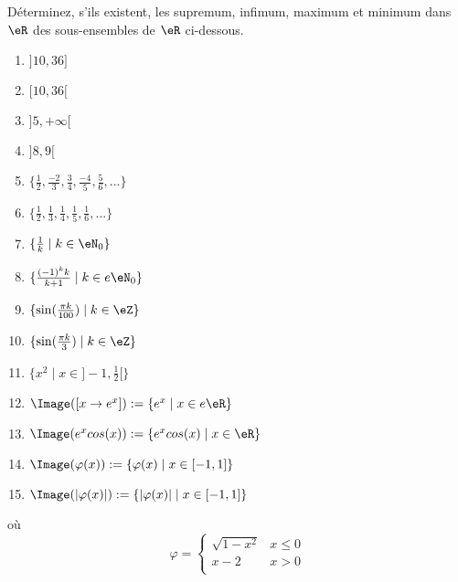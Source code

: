 
\begin{exercice}\label{exo0001}

Déterminez, s'ils existent, les supremum, infimum, maximum et minimum dans $\eR$ des sous-ensembles de $\eR$ ci-dessous.
\begin{multicols}{2}
\begin{enumerate}
\item $]10,36] $
\item $[10,36[ $
\item $]5,+\infty[ $
\item $]8,9[ $
\item $\{ \frac{1}{2}, \frac{-2}{3}, \frac{3}{4}, \frac{-4}{5},  \frac{5}{6}, ... \} $
\item $\{ \frac{1}{2}, \frac{1}{3}, \frac{1}{4}, \frac{1}{5},  \frac{1}{6}, ... \} $
\item\label{itemexo1g} $\{ \frac{1}{k} \mid k \in \eN_0 \} $
\item\label{itemexo1h} $\{ \frac{(-1)^k k}{k+1} \mid k \in e\eN_0 \} $
\item $\{ \sin(\frac{\pi k}{100}) \mid k \in \eZ \} $
\item $\{ \sin(\frac{\pi k}{3}) \mid k \in \eZ \} $
\item\label{itemexo1k}  $\{ x^2 \mid x\in ]-1,\frac{1}{2} [ \} $
\item $\Image([x \rightarrow e^x]) := \{ e^x \mid x\in e\eR \}$
\item $\Image(e^x cos(x)) := \{ e^x cos(x) \mid x\in \eR \} $
\item $\Image(\varphi(x)) := \{ \varphi(x) \mid x \in [-1,1] \} $
\item $\Image( |\varphi(x)| ) := \{  |\varphi(x)| \mid x \in [-1,1] \} $
\end{enumerate}
\end{multicols}
où
\[
\varphi= \left\{ \begin{array}{ll} \sqrt{1-x^2} & x \leq 0 \\ x-2 & x>0 \\ \end{array} \right.
\]

\end{exercice}
